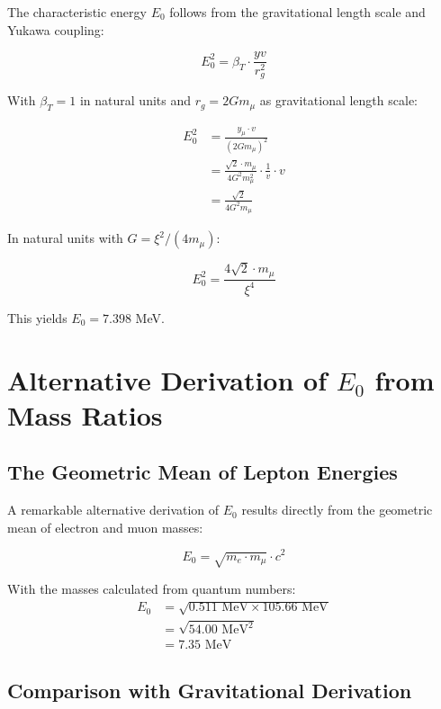 \documentclass[12pt,a4paper]{report}
\begin{document}
	The characteristic energy $E_0$ follows from the gravitational length scale and Yukawa coupling:
	
	\begin{equation}
		E_0^2 = \beta_T \cdot \frac{yv}{r_g^2}
	\end{equation}
	
	With $\beta_T = 1$ in natural units and $r_g = 2Gm_\mu$ as gravitational length scale:
	
	\begin{align}
		E_0^2 &= \frac{y_\mu \cdot v}{(2Gm_\mu)^2}\\
		&= \frac{\sqrt{2} \cdot m_\mu}{4G^2 m_\mu^2} \cdot \frac{1}{v} \cdot v\\
		&= \frac{\sqrt{2}}{4G^2 m_\mu}
	\end{align}
	
	In natural units with $G = \xi^2/(4m_\mu)$:
	
	\begin{equation}
		E_0^2 = \frac{4\sqrt{2} \cdot m_\mu}{\xi^4}
	\end{equation}
	
	This yields $E_0 = 7.398$ MeV.
	
	\section{Alternative Derivation of $E_0$ from Mass Ratios}
	
	\subsection{The Geometric Mean of Lepton Energies}
	
	A remarkable alternative derivation of $E_0$ results directly from the geometric mean of electron and muon masses:
	
	\begin{equation}
		E_0 = \sqrt{m_e \cdot m_\mu} \cdot c^2
	\end{equation}
	
	With the masses calculated from quantum numbers:
	\begin{align}
		E_0 &= \sqrt{0.511 \text{ MeV} \times 105.66 \text{ MeV}}\\
		&= \sqrt{54.00 \text{ MeV}^2}\\
		&= 7.35 \text{ MeV}
	\end{align}
	
	\subsection{Comparison with Gravitational Derivation}
	
\end{document}
